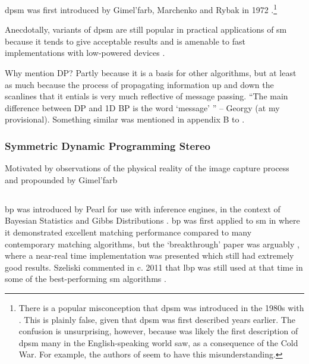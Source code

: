 \gls{dpsm} was first introduced by Gimel'farb, Marchenko and Rybak in 1972 \cite{Gimelfarb1972}.\footnote{There is a popular misconception that \gls{dpsm} was introduced in the 1980s with \cite{Ohta1985}.  This is plainly false, given that \gls{dpsm} was first described years earlier.  The confusion is unsurprising, however, because \cite{Ohta1985} was likely the first description of \gls{dpsm} many in the English-speaking world saw, as a consequence of the Cold War.  For example, the authors \cite{Salmen2009} of seem to have this misunderstanding.}  


Anecdotally, variants of \gls{dpsm} are still popular in practical applications of \gls{sm} because it tends to give acceptable results \fxerror[inline]{[ref?]} and is amenable to fast implementations with low-powered devices \fxerror[inline]{[ref?]}.

\begin{anfxnote}{Why mention DP?}
    Partly because it is a basis for other algorithms, but at least as much because the process of propagating information up and down the scanlines that it entials is very much reflective of message passing.  ``The main difference between DP and 1D BP is the word `message' '' -- Georgy (at my provisional).  Something similar was mentioned in appendix B to \cite{Szeliski2011}.
\end{anfxnote}

\subsubsection{Symmetric Dynamic Programming Stereo}
Motivated by observations of the physical reality of the image capture process and propounded by Gimel'farb 

\subsection{}
\gls{bp} was introduced by Pearl \cite{Pearl1982} for use with inference engines, in the context of Bayesian Statistics \fxerror[inline]{[ref]} and Gibbs Distributions \fxerror[inline]{[ref]}.  \gls{bp} was first applied to \gls{sm} in \cite{Sun2003} where it demonstrated excellent matching performance compared to many contemporary matching algorithms, but the `breakthrough' paper was arguably \cite{Felzenszwalb2006}, where a near-real time implementation was presented which still had extremely good results.  Szeliski commented in c. 2011 that \gls{lbp} was still used at that time in some of the best-performing \gls{sm} algorithms \cite[p. 163]{Szeliski2011}.

